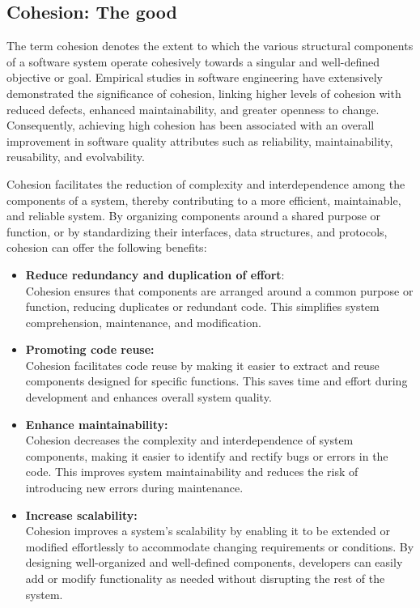 \subsection{Cohesion: The good} \label{subsec:on_modularity}

The term cohesion denotes the extent to which the various structural components of a
software system operate cohesively towards a singular and well-defined objective or goal.
Empirical studies in software engineering have extensively demonstrated the significance
of cohesion, linking higher levels of cohesion with reduced defects, enhanced
maintainability, and greater openness to change. Consequently, achieving high cohesion has
been associated with an overall improvement in software quality attributes such as
reliability, maintainability, reusability, and evolvability.

Cohesion facilitates the reduction of complexity and interdependence among the components
of a system, thereby contributing to a more efficient, maintainable, and reliable system.
By organizing components around a shared purpose or function, or by standardizing their
interfaces, data structures, and protocols, cohesion can offer the following benefits:

\begin{itemize}
    \item \textbf{Reduce redundancy and duplication of effort}: \\
    Cohesion ensures that components are arranged around a common purpose or function,
    reducing duplicates or redundant code. This simplifies system comprehension,
    maintenance, and modification.
    \item \textbf{Promoting code reuse:}\\
    Cohesion facilitates code reuse by making it easier to extract and reuse components
    designed for specific functions. This saves time and effort during development and
    enhances overall system quality.
    \item \textbf{Enhance maintainability:}\\
    Cohesion decreases the complexity and interdependence of system components, making it
    easier to identify and rectify bugs or errors in the code. This improves system
    maintainability and reduces the risk of introducing new errors during maintenance.
    \item \textbf{Increase scalability:}\\
    Cohesion improves a system's scalability by enabling it to be extended or modified
    effortlessly to accommodate changing requirements or conditions. By designing
    well-organized and well-defined components, developers can easily add or modify
    functionality as needed without disrupting the rest of the system.  
\end{itemize}


